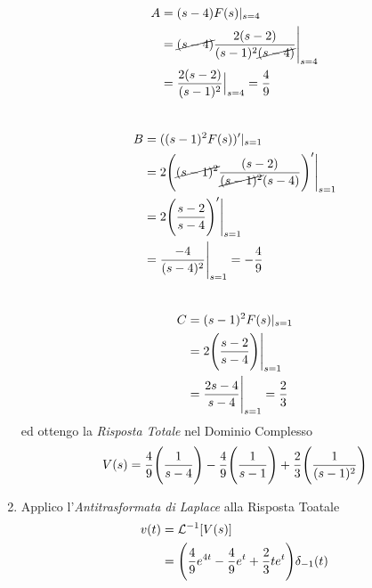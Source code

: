 \documentclass{article}
\newcommand{\AntiLaplace}{\mathop{\mathcal{L}^{-1}}}
\begin{document}
\begin{enumerate}
\[					  \]
					  \[
					  	\begin{aligned}
					  		A &= (s - 4)F(s)\vert_{s=4} \\
							&= \cancel{(s - 4)}{{2(s - 2)}\over{(s - 1)^2\cancel{(s - 4)}}}\Bigg\vert_{s=4} \\
							&= {{2(s - 2)}\over{(s - 1)^2}}\Big\vert_{s=4} = {{4}\over{9}}
					  	\end{aligned}
					  \]
					  \\
					  \[
					  	\begin{aligned}
							B &= ((s - 1)^2 F(s))'\vert_{s=1} \\
							&= 2\Bigg( \cancel{(s - 1)^2}{{(s - 2)}\over{\cancel{(s-1)^2}(s - 4)}} \Bigg)'\Bigg\vert_{s=1} \\
							&= 2\Bigg( {{s - 2}\over{s - 4}} \Bigg)'\Bigg\vert_{s=1} \\
							&= {{-4}\over{(s - 4)^2}}\Bigg\vert_{s=1} = -{{4}\over{9}}
					  	\end{aligned}
					  \]
					  \\
					  \[
						\begin{aligned}
							C &= (s - 1)^2 F(s)\vert_{s=1} \\
							&= 2\Bigg( {{s - 2}\over{s - 4}} \Bigg)\Bigg\vert_{s=1} \\
							&= {{2s - 4}\over{s - 4}}\Bigg\vert_{s=1} = {{2}\over{3}}
						\end{aligned}
					  \]
					  ed ottengo la \textit{Risposta Totale} nel Dominio Complesso
					  \[
					  	V(s) = {{4}\over{9}}\Bigg( {{1}\over{s - 4}} \Bigg) - {{4}\over{9}}\Bigg( {{1}\over{s - 1}} \Bigg) + {{2}\over{3}}\Bigg( {{1}\over{(s - 1)^2}} \Bigg)
					  \]
				\item Applico l'\textit{Antitrasformata di Laplace} alla Risposta Toatale
					  \[
					  	\begin{aligned}
							v(t) &= \AntiLaplace[V(s)] \\
					  		&= \Bigg( {{4}\over{9}}e^{4t} - {{4}\over{9}}e^t + {{2}\over{3}}te^t \Bigg)\delta_{-1}(t)
					  	\end{aligned}
					  \]
			\end{enumerate}

		\newpage
\end{document}
